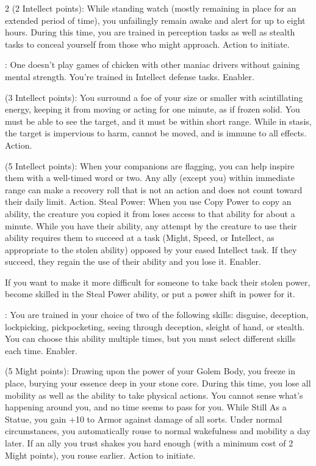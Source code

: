 \begin{multicols}{2}
 (2 Intellect points): While standing watch (mostly remaining in place for an extended period of time), you unfailingly remain awake and alert for up to eight hours. During this time, you are trained in perception tasks as well as stealth tasks to conceal yourself from those who might approach. Action to initiate. 
 
: One doesn’t play games of chicken with other maniac drivers without gaining mental strength. You’re trained in Intellect defense tasks. Enabler. 
 
 (3 Intellect points): You surround a foe of your size or smaller with scintillating energy, keeping it from moving or acting for one minute, as if frozen solid. You must be able to see the target, and it must be within short range. While in stasis, the target is impervious to harm, cannot be moved, and is immune to all effects. Action. 
 
 (5 Intellect points): When your companions are flagging, you can help inspire them with a well-timed word or two. Any ally (except you) within immediate range can make a recovery roll that is not an action and does not count toward their daily limit. Action. 
Steal Power: When you use Copy Power to copy an ability, the creature you copied it from loses access to that ability for about a minute. While you have their ability, any attempt by the creature to use their ability requires them to succeed at a task (Might, Speed, or Intellect, as appropriate to the stolen ability) opposed by your eased Intellect task. If they succeed, they regain the use of their ability and you lose it. Enabler.

If you want to make it more difficult for someone to take back their stolen power, become skilled in the Steal Power ability, or put a power shift in power for it.
 
: You are trained in your choice of two of the following skills: disguise, deception, lockpicking, pickpocketing, seeing through deception, sleight of hand, or stealth. You can choose this ability multiple times, but you must select different skills each time. Enabler. 
 
 (5 Might points): Drawing upon the power of your Golem Body, you freeze in place, burying your essence deep in your stone core. During this time, you lose all mobility as well as the ability to take physical actions. You cannot sense what’s happening around you, and no time seems to pass for you. While Still As a Statue, you gain +10 to Armor against damage of all sorts. Under normal circumstances, you automatically rouse to normal wakefulness and mobility a day later. If an ally you trust shakes you hard enough (with a minimum cost of 2 Might points), you rouse earlier. Action to initiate. 
 

\end{multicols}

